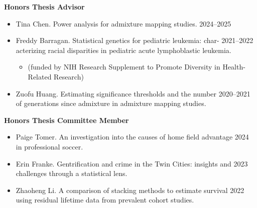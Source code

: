 \documentclass[margin]{res}
\begin{document}
\begin{resume}

\textbf{Honors Thesis Advisor}
\begin{itemize}
\item Tina Chen. Power analysis for admixture mapping studies. \hfill 2024--2025
\item Freddy Barragan. Statistical genetics for pediatric leukemia: char- \hfill 2021--2022 \\ acterizing racial disparities in pediatric acute lymphoblastic leukemia.
\begin{itemize} \vspace{-0.2cm}
	\item[] 
	\begin{footnotesize}(funded by NIH Research Supplement to Promote Diversity in Health-Related Research) \end{footnotesize}
	\end{itemize} \vspace{-0.1cm}
\item Zuofu Huang. Estimating significance thresholds and the number  \hfill 2020--2021 \\of generations since admixture in admixture mapping studies. %
\end{itemize}

\textbf{Honors Thesis Committee Member}
\begin{itemize}
\item Paige Tomer.  An investigation into the causes of home field advantage \hfill 2024 \\ in professional soccer. 
\item Erin Franke. Gentrification and crime in the Twin Cities: insights and \hfill 2023 \\ challenges through a statistical lens. 
\item Zhaoheng Li. A comparison of stacking methods to estimate survival  \hfill 2022 \\ using residual lifetime data from prevalent cohort studies.  %
\end{itemize}


\end{resume}
\end{document}
